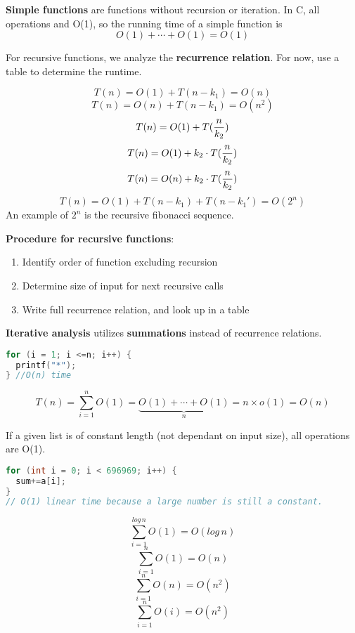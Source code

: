 \documentclass[english, 12pt]{article}
\begin{document}
\begin{defn}
\textbf{Simple functions} are functions without recursion or iteration. In C, all operations and O(1), so the running time of a simple function is
\[O(1) + \cdots + O(1) = O(1)\]
\end{defn}


\begin{defn}
For recursive functions, we analyze the \textbf{recurrence relation}. For now, use a table to determine the runtime.

\[T(n) = O(1) + T(n - k_1) = O(n)\]
\[T(n) = O(n) + T(n - k_1) = O(n^2)\]
\[T(n) = O(1) + T(\frac{n}{k_2})\]
\[T(n) = O(1) + k_2 \cdot T(\frac{n}{k_2})\]
\[T(n) = O(n) + k_2 \cdot T(\frac{n}{k_2})\]
\[T(n) = O(1) + T(n-k_1) + T(n-k_1') = O(2^n)\]
An example of $2^n$ is the recursive fibonacci sequence.
\end{defn}

\begin{mthd}
\textbf{Procedure for recursive functions}:
\begin{enumerate}
\item Identify order of function excluding recursion
\item Determine size of input for next recursive calls
\item Write full recurrence relation, and look up in a table
\end{enumerate}
\end{mthd}

\begin{defn}
\textbf{Iterative analysis} utilizes \textbf{summations} instead of recurrence relations.
\begin{lstlisting}[language=C]
for (i = 1; i <=n; i++) {
  printf("*");
} //O(n) time
\end{lstlisting}
\[T(n) = \sum_{i=1}^n O(1) = \underbrace{O(1) + \cdots + O(1)}_n = n \times o(1) = O(n)\]
\end{defn}

\begin{note}
If a given list is of constant length (not dependant on input size), all operations are O(1).
\begin{lstlisting}[language=C]
for (int i = 0; i < 696969; i++) {
  sum+=a[i];
}
// O(1) linear time because a large number is still a constant.
\end{lstlisting}
\[\sum_{i=1}^{log\,n} O(1) = O(log\,n)\]
\[\sum_{i=1}^{n} O(1) = O(n)\]
\[\sum_{i=1}^{n} O(n) = O(n^2)\]
\[\sum_{i=1}^{n} O(i) = O(n^2)\]
\end{note}
\end{document}
